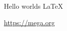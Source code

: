 \documentclass{article}
\begin{document}
Hello worlds \LaTeX

\url{https://mega.org}
\end{document}
